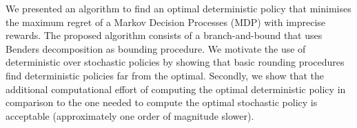 We presented an algorithm to find an optimal deterministic policy that minimises the maximum regret of a Markov Decision Processes (MDP) with imprecise rewards.
The proposed algorithm consists of a branch-and-bound that uses Benders decomposition as bounding procedure. %
We motivate the use of deterministic over stochastic policies by showing that basic rounding procedures find deterministic policies far from the optimal. Secondly, we show that the additional computational effort of computing the optimal deterministic policy in comparison to the one needed to compute the optimal stochastic policy is acceptable (approximately one order of magnitude slower).
